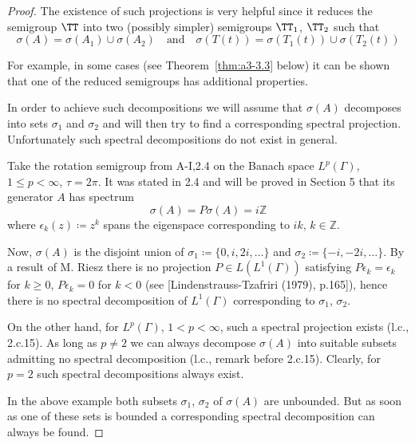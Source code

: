 \begin{proof}
The existence of such projections is very helpful since it reduces the semigroup $\TT$ into two (possibly simpler) semigroups $\TT_{1}$, $\TT_{2}$ such that
\[
\sigma(A) = \sigma(A_{1}) \cup \sigma(A_{2}) \quad \text{and} \quad \sigma(T(t)) = \sigma(T_{1}(t)) \cup \sigma(T_{2}(t))
\]

For example, in some cases (see Theorem~\ref{thm:a3-3.3} below) it can be shown that one of the reduced semigroups has additional properties.

In order to achieve such decompositions we will assume that $\sigma(A)$ decomposes into sets $\sigma_{1}$ and $\sigma_{2}$ and will then try to find a corresponding spectral projection.
Unfortunately such spectral decompositions do not exist in general.

\begin{example}\label{ex:a3-3.2}

Take the rotation semigroup from A-I,2.4 on the Banach space $L^{p}(\Gamma)$, $1 \leq p < \infty$, $\tau = 2\pi$.
It was stated in 2.4 and will be proved in Section 5 that its generator $A$ has spectrum
\[
\sigma(A) = P\sigma(A) = i\mathbb{Z}
\]
where $\epsilon_{k}(z) \coloneqq z^{k}$ spans the eigenspace corresponding to $ik$, $k \in \mathbb{Z}$.

Now, $\sigma(A)$ is the disjoint union of $\sigma_{1} \coloneqq \{0,i,2i,\ldots\}$ and $\sigma_{2} \coloneqq \{-i,-2i,\ldots\}$.
By a result of M. Riesz there is no projection $P \in L(L^{1}(\Gamma))$ satisfying $P\epsilon_{k} = \epsilon_{k}$ for $k \geq 0$, $P\epsilon_{k} = 0$ for $k < 0$ (see [Lindenstrauss-Tzafriri (1979), p.165]), hence there is no spectral decomposition of $L^{1}(\Gamma)$ corresponding to $\sigma_{1}$, $\sigma_{2}$.

On the other hand, for $L^{p}(\Gamma)$, $1 < p < \infty$, such a spectral projection exists (l.c., 2.c.15).
As long as $p \neq 2$ we can always decompose $\sigma(A)$ into suitable subsets admitting no spectral decomposition (l.c., remark before 2.c.15).
Clearly, for $p = 2$ such spectral decompositions always exist.
\end{example}

\newpage

In the above example both subsets $\sigma_{1}$, $\sigma_{2}$ of $\sigma(A)$ are unbounded.
But as soon as one of these sets is bounded a corresponding spectral decomposition can always be found.


\end{proof}
